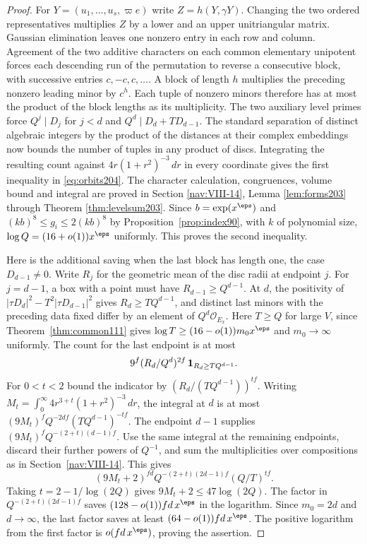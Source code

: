 \documentclass[a4paper,11pt]{article}
\theoremstyle{definition}
\theoremstyle{remark}
\numberwithin{equation}{section}
\begin{document}
\begin{proof}
For \(Y=(u_1,\ldots,u_s,\varpi e)\) write \(Z=h(Y,\gamma Y)\).
Changing the two ordered representatives multiplies \(Z\) by a lower
and an upper unitriangular matrix. Gaussian elimination leaves one
nonzero entry in each row and column. Agreement of the two additive
characters on each common elementary unipotent forces each descending
run of the permutation to reverse a consecutive block, with successive
entries \(c,-c,c,\ldots\). A block of length \(h\) multiplies the
preceding nonzero leading minor by \(c^h\). Each tuple of nonzero
minors therefore has at most the product of the block lengths as its
multiplicity. The two auxiliary level primes force \(Q^j\mid D_j\)
for \(j<d\) and \(Q^d\mid D_d+T D_{d-1}\). The standard separation
of distinct algebraic integers by the product of the distances at
their complex embeddings now bounds the number of tuples in any
product of discs. Integrating the resulting count against
\(4r(1+r^2)^{-3}\,dr\) in every coordinate gives the first inequality
in \eqref{eq:orbits204}. The character calculation, congruences, volume
bound and integral are proved in
Section \ref{nav:VIII-14}, Lemma \ref{lem:forms203} through Theorem \ref{thm:levelsum203}. Since \(b=\exp(x^\eps)\) and
\((kb)^8\le g_i\le2(kb)^8\) by Proposition~\ref{prop:index90},
with \(k\) of polynomial size, \(\log Q=(16+o(1))x^\eps\)
uniformly. This proves the second inequality.

Here is the additional saving when the last block has length one,
the case \(D_{d-1}\ne0\). Write \(R_j\) for the geometric mean
of the disc radii at endpoint \(j\). For \(j=d-1\), a box with a
point must have \(R_{d-1}\ge Q^{d-1}\). At \(d\), the positivity
of \(|\tau D_d|^2-T^2|\tau D_{d-1}|^2\) gives
\(R_d\ge T Q^{d-1}\), and distinct last minors with the preceding
data fixed differ by an element of \(Q^d\mathcal O_{E_x}\).
Here \(T\ge Q\) for large \(V\), since Theorem~\ref{thm:common111}
gives \(\log T\ge(16-o(1))m_0 x^\eps\) and \(m_0\to\infty\)
uniformly. The count for the last endpoint is at most
\[
       9^f(R_d/Q^d)^{2f}\,{\bf1}_{R_d\ge TQ^{d-1}} .
\]
For \(0<t<2\) bound the indicator by
\((R_d/(TQ^{d-1}))^{tf}\). Writing
\(M_t=\int_0^\infty4r^{3+t}(1+r^2)^{-3}\,dr\), the integral
at \(d\) is at most \((9M_t)^f Q^{-2df}(TQ^{d-1})^{-tf}\).
The endpoint \(d-1\) supplies
\((9M_t)^f Q^{-(2+t)(d-1)f}\). Use the same integral at the
remaining endpoints, discard their further powers of \(Q^{-1}\),
and sum the multiplicities over compositions as in Section~\ref{nav:VIII-14}.
This gives
\[
     (9M_t+2)^{fd}Q^{-(2+t)(2d-1)f}(Q/T)^{tf}.
\]
Taking \(t=2-1/\log(2Q)\) gives \(9M_t+2\le47\log(2Q)\).
The factor in \(Q^{-(2+t)(2d-1)f}\) saves
\((128-o(1))fd\,x^\eps\) in the logarithm. Since \(m_0=2d\) and
\(d\to\infty\), the last factor saves at least
\((64-o(1))fd\,x^\eps\). The positive logarithm from the first
factor is \(o(fd\,x^\eps)\), proving the assertion.
\end{proof}
\end{document}
